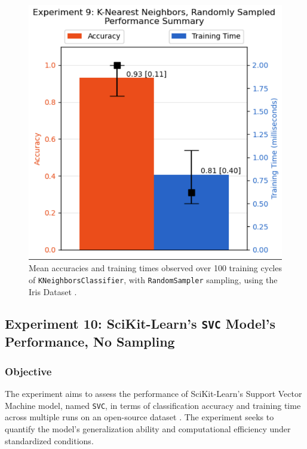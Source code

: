 \documentclass{article}
\theoremstyle{plain}
\theoremstyle{definition}
\theoremstyle{remark}
\begin{document}
\begin{figure}[ht]
	\vskip 0.2in
	\begin{center}
		\centerline{\includegraphics[width=\columnwidth]{experiment_09}}
		\caption{Mean accuracies and training times observed over 100 training cycles of \texttt{KNeighborsClassifier}, with \texttt{RandomSampler} sampling, using the Iris Dataset \cite{iris}.}
		\label{experiment_09}
	\end{center}
	\vskip -0.2in
\end{figure}


\subsection{Experiment 10: SciKit-Learn's \texttt{SVC} Model's Performance, No Sampling}

\subsubsection{Objective}

The experiment aims to assess the performance of SciKit-Learn's Support Vector Machine model, named \texttt{SVC}, in terms of classification accuracy and training time across multiple runs on an open-source dataset \cite{iris}. The experiment seeks to quantify the model's generalization ability and computational efficiency under standardized conditions.
\end{document}
